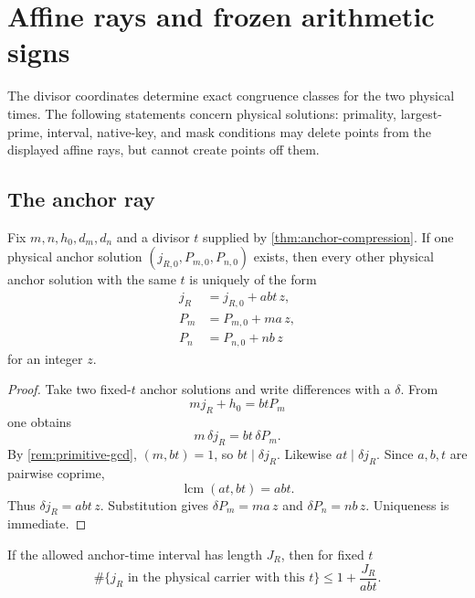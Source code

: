 \section{Affine rays and frozen arithmetic signs}
\label{sec:rays-and-signs}

The divisor coordinates determine exact congruence classes for the two
physical times.  The following statements concern physical solutions:
primality, largest-prime, interval, native-key, and mask conditions may
delete points from the displayed affine rays, but cannot create points
off them.

\subsection{The anchor ray}

\begin{theorem}
\label{thm:anchor-ray}
Fix \(m,n,h_0,d_m,d_n\) and a divisor \(t\) supplied by
\cref{thm:anchor-compression}.  If one physical anchor solution
\((j_{R,0},P_{m,0},P_{n,0})\) exists, then every other physical anchor
solution with the same \(t\) is uniquely of the form
\begin{align}
 j_R&=j_{R,0}+abt\,z,
 \label{eq:anchor-time-ray}\\
 P_m&=P_{m,0}+ma\,z,
 \label{eq:anchor-Pm-ray}\\
 P_n&=P_{n,0}+nb\,z
 \label{eq:anchor-Pn-ray}
\end{align}
for an integer \(z\).
\end{theorem}

\begin{proof}
Take two fixed-\(t\) anchor solutions and write differences with a
\(\delta\).  From
\[
 mj_R+h_0=btP_m
\]
one obtains
\[
 m\,\delta j_R=bt\,\delta P_m.
\]
By \cref{rem:primitive-gcd}, \((m,bt)=1\), so \(bt\mid\delta j_R\).
Likewise \(at\mid\delta j_R\).  Since \(a,b,t\) are pairwise coprime,
\[
 \operatorname{lcm}(at,bt)=abt.
\]
Thus \(\delta j_R=abt\,z\).  Substitution gives
\(\delta P_m=ma\,z\) and \(\delta P_n=nb\,z\).  Uniqueness is immediate.
\end{proof}

\begin{corollary}
\label{cor:anchor-census}
If the allowed anchor-time interval has length \(J_R\), then for fixed
\(t\)
\begin{equation}
 \#\{j_R\text{ in the physical carrier with this }t\}
 \le 1+\frac{J_R}{abt}.
 \label{eq:anchor-census}
\end{equation}
\end{corollary}

